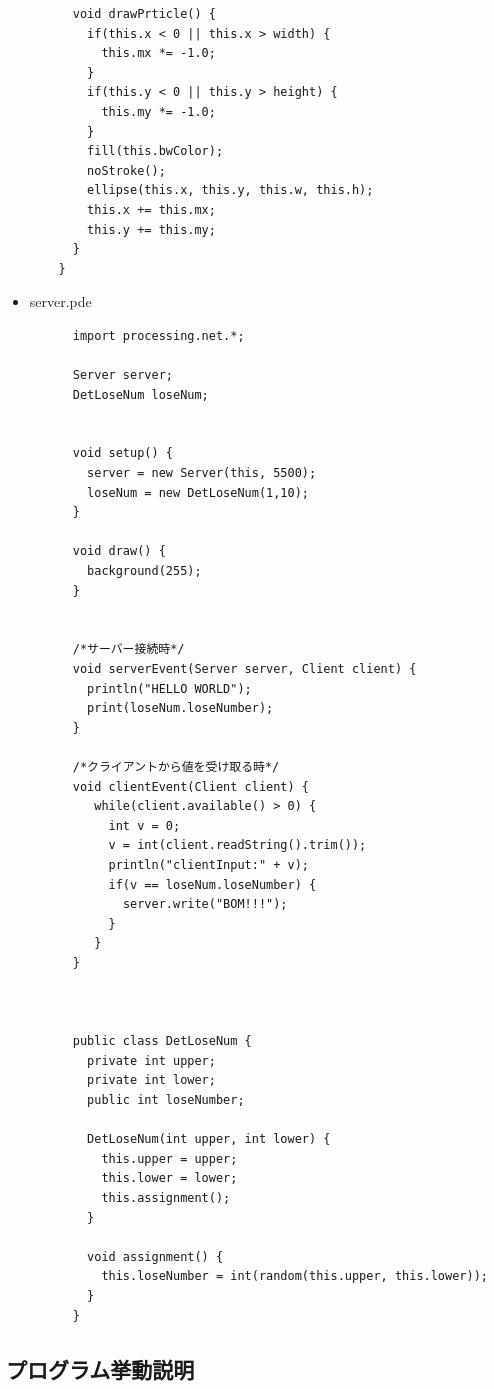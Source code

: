 \documentclass[dvipdfmx]{jsarticle}
\begin{document}
\begin{itemize}
\begin{verbatim}
      void drawPrticle() {
        if(this.x < 0 || this.x > width) {
          this.mx *= -1.0;
        }
        if(this.y < 0 || this.y > height) {
          this.my *= -1.0;
        }
        fill(this.bwColor);
        noStroke();
        ellipse(this.x, this.y, this.w, this.h);
        this.x += this.mx;
        this.y += this.my;
      }
    }
  \end{verbatim}
  \item server.pde
  \begin{verbatim}
      import processing.net.*;

      Server server;
      DetLoseNum loseNum;


      void setup() {
        server = new Server(this, 5500);
        loseNum = new DetLoseNum(1,10);
      }

      void draw() {
        background(255);
      }


      /*サーバー接続時*/
      void serverEvent(Server server, Client client) {
        println("HELLO WORLD");
        print(loseNum.loseNumber);
      }

      /*クライアントから値を受け取る時*/
      void clientEvent(Client client) {
         while(client.available() > 0) {
           int v = 0;
           v = int(client.readString().trim());
           println("clientInput:" + v);
           if(v == loseNum.loseNumber) {
             server.write("BOM!!!");
           }
         }
      }



      public class DetLoseNum {
        private int upper;
        private int lower;
        public int loseNumber;

        DetLoseNum(int upper, int lower) {
          this.upper = upper;
          this.lower = lower;
          this.assignment();
        }

        void assignment() {
          this.loseNumber = int(random(this.upper, this.lower));
        }
      }
  \end{verbatim}
\end{itemize}
\subsection{プログラム挙動説明}
\end{document}
